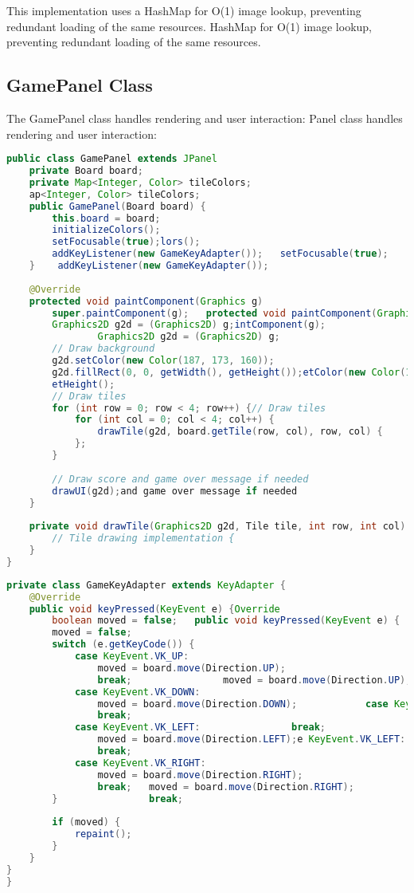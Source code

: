 \documentclass[12pt, a4paper]{article}
\begin{document}
This implementation uses a HashMap for O(1) image lookup, preventing redundant loading of the same resources.
 HashMap for O(1) image lookup, preventing redundant loading of the same resources.
\subsection{GamePanel Class}
The GamePanel class handles rendering and user interaction:
Panel class handles rendering and user interaction:
\begin{lstlisting}[language=Java, caption=GamePanel Rendering]
public class GamePanel extends JPanel
    private Board board;
    private Map<Integer, Color> tileColors;
    ap<Integer, Color> tileColors;
    public GamePanel(Board board) {
        this.board = board;
        initializeColors();
        setFocusable(true);lors();
        addKeyListener(new GameKeyAdapter());   setFocusable(true);
    }    addKeyListener(new GameKeyAdapter());
    
    @Override
    protected void paintComponent(Graphics g) 
        super.paintComponent(g);   protected void paintComponent(Graphics g) {
        Graphics2D g2d = (Graphics2D) g;intComponent(g);
                Graphics2D g2d = (Graphics2D) g;
        // Draw background
        g2d.setColor(new Color(187, 173, 160));
        g2d.fillRect(0, 0, getWidth(), getHeight());etColor(new Color(187, 173, 160));
        etHeight();
        // Draw tiles
        for (int row = 0; row < 4; row++) {// Draw tiles
            for (int col = 0; col < 4; col++) {
                drawTile(g2d, board.getTile(row, col), row, col) {
            };
        }
        
        // Draw score and game over message if needed
        drawUI(g2d);and game over message if needed
    }
    
    private void drawTile(Graphics2D g2d, Tile tile, int row, int col) {
        // Tile drawing implementation {
    }
}
\end{lstlisting}

\begin{lstlisting}[language=Java, caption=Key Event Handling]
private class GameKeyAdapter extends KeyAdapter {
    @Override
    public void keyPressed(KeyEvent e) {Override
        boolean moved = false;   public void keyPressed(KeyEvent e) {
        moved = false;
        switch (e.getKeyCode()) {        
            case KeyEvent.VK_UP:
                moved = board.move(Direction.UP);
                break;                moved = board.move(Direction.UP);
            case KeyEvent.VK_DOWN:
                moved = board.move(Direction.DOWN);            case KeyEvent.VK_DOWN:
                break;
            case KeyEvent.VK_LEFT:                break;
                moved = board.move(Direction.LEFT);e KeyEvent.VK_LEFT:
                break;
            case KeyEvent.VK_RIGHT:
                moved = board.move(Direction.RIGHT);
                break;   moved = board.move(Direction.RIGHT);
        }                break;
        
        if (moved) {
            repaint();
        }
    }
}
}
\end{lstlisting}
\end{document}
